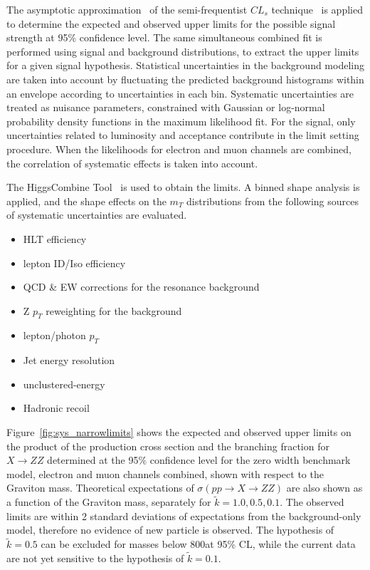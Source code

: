 \vspace{0.3cm}
The asymptotic approximation~\cite{sys_cls0} of the semi-frequentist $CL_s$ technique~\cite{sys_cls1,sys_cls2,sys_cls3} is applied to determine the expected and observed upper limits for the possible signal strength at 95\% confidence level. The same simultaneous combined fit is performed using signal and background distributions, to extract the upper limits for a given signal hypothesis. Statistical uncertainties in the background modeling are taken into account by fluctuating the predicted background histograms within an envelope according to uncertainties in each bin. Systematic uncertainties are treated as nuisance parameters, constrained with Gaussian or log-normal probability density functions in the maximum likelihood fit. For the signal, only uncertainties related to luminosity and acceptance contribute in the limit setting procedure. When the likelihoods for electron and muon channels are combined, the correlation of systematic effects is taken into account. 

\vspace{0.3cm}
The HiggsCombine Tool~\cite{sys_higgscombinetool} is used to obtain the limits. A binned shape analysis is applied, and the shape effects on the $m_T$ distributions from the following sources of systematic uncertainties are evaluated.
\begin{itemize}
\item HLT efficiency
\item lepton ID/Iso efficiency
\item QCD \& EW corrections for the resonance background
\item Z $p_T$ reweighting for the \Zjets background
\item \ptmiss lepton/photon $p_T$
\item \ptmiss Jet energy resolution
\item \ptmiss unclustered-energy
\item \ptmiss Hadronic recoil 
\end{itemize}

\vspace{0.3cm}
Figure~\ref{fig:sys_narrowlimits} shows the expected and observed upper limits on the product of the production cross section and the branching fraction for $X\rightarrow ZZ$ determined at the 95\% confidence level for the zero width benchmark model, electron and muon channels combined, shown with respect to the Graviton mass. Theoretical expectations of $\sigma(pp\rightarrow X\rightarrow ZZ)$ are also shown as a function of the Graviton mass, separately for $\tilde{k}=1.0,0.5,0.1$. The observed limits are within 2 standard deviations of expectations from the background-only model, therefore no evidence of new particle is observed. The hypothesis of $\tilde{k}=0.5$ can be excluded for masses below 800\GeV at 95\% CL, while the current data are not yet sensitive to the hypothesis of $\tilde{k}=0.1$. 

